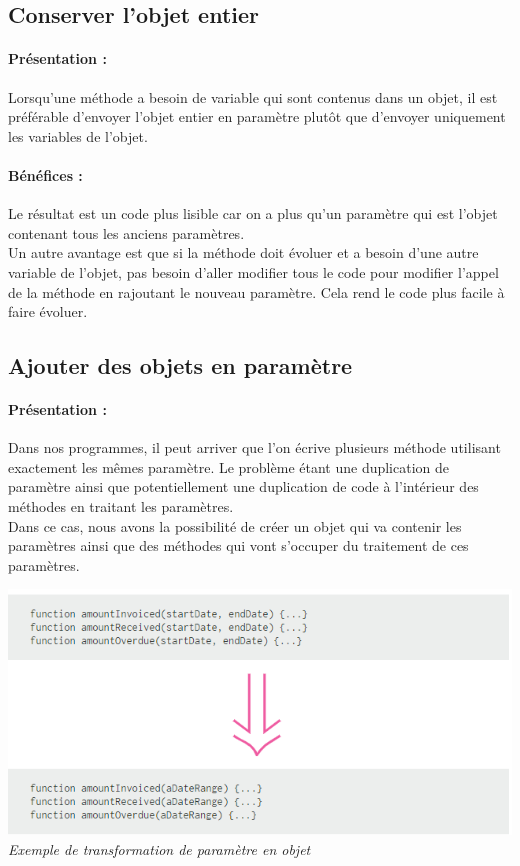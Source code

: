 \documentclass[a4paper,twoside,12pt,openright]{report}
\begin{document}
\subsection{Conserver l'objet entier}
\paragraph{Présentation :}
Lorsqu'une méthode a besoin de variable qui sont contenus dans un objet, il est préférable d'envoyer l'objet entier en paramètre plutôt que d'envoyer uniquement les variables de l'objet.

\paragraph{Bénéfices :}
Le résultat est un code plus lisible car on a plus qu'un paramètre qui est l'objet contenant tous les anciens paramètres.\\
Un autre avantage est que si la méthode doit évoluer et a besoin d'une autre variable de l'objet, pas besoin d'aller modifier tous le code pour modifier l'appel de la méthode en rajoutant le nouveau paramètre. Cela rend le code plus facile à faire évoluer.\\

\subsection{Ajouter des objets en paramètre}
\paragraph{Présentation :}
Dans nos programmes, il peut arriver que l'on écrive plusieurs méthode utilisant exactement les mêmes paramètre. Le problème étant une duplication de paramètre ainsi que potentiellement une duplication de code à l'intérieur des méthodes en traitant les paramètres.\\
Dans ce cas, nous avons la possibilité de créer un objet qui va contenir les paramètres ainsi que des méthodes qui vont s'occuper du traitement de ces paramètres.\\

\begin{center}
\includegraphics[scale=1]{Image/Ajout_Objet_Parametre.png}\\
\itshape{Exemple de transformation de paramètre en objet \cite{ref8}}
\end{center}
\end{document}

